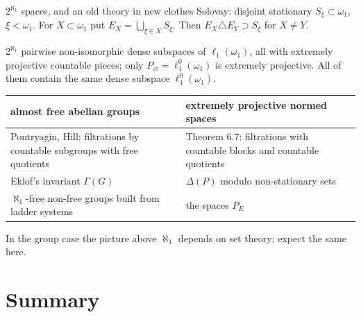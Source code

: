 \documentclass[10pt,aspectratio=169]{beamer}
\newcommand{\lo}[1]{\ell_1^0(#1)}
\newcommand{\ellone}[1]{\ell_1(#1)}
\begin{document}
\begin{frame}{$2^{\aleph_1}$ spaces, and an old theory in new clothes}
  Solovay: disjoint stationary $S_\xi\subset\omega_1$, $\xi<\omega_1$. For
  $X\subset\omega_1$ put $E_X=\bigcup_{\xi\in X}S_\xi$. Then $E_X\triangle E_Y\supset S_\xi$
  for $X\ne Y$.
  \begin{alertblock}{}
    $2^{\aleph_1}$ pairwise non-isomorphic dense subspaces of $\ellone{\omega_1}$,
    all with extremely projective countable pieces; only $P_\varnothing=\lo{\omega_1}$
    is extremely projective. All of them contain the same dense subspace $\lo{\omega_1}$.
  \end{alertblock}
  \medskip
  {\small
  \renewcommand{\arraystretch}{1.2}
  \begin{tabular}{@{}p{}p{}@{}}
    \toprule
    almost free abelian groups & extremely projective normed spaces\\
    \midrule
    Pontryagin, Hill: filtrations by countable subgroups with free quotients
      & Theorem 6.7: filtrations with countable blocks and countable quotients\\
    Eklof's invariant $\Gamma(G)$ & $\Delta(P)$ modulo non-stationary sets\\
    $\aleph_1$-free non-free groups built from ladder systems & the spaces $P_E$\\
    \bottomrule
  \end{tabular}}
  \medskip

  In the group case the picture above $\aleph_1$ depends on set theory; expect
  the same here.
\end{frame}

\section{Summary}
\end{document}

